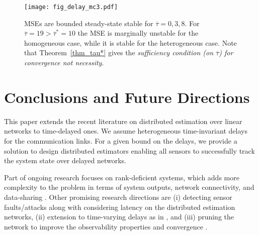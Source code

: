 \documentclass[journal]{IEEEtran}
\begin{document}
\begin{figure} %
	\centering
	\texttt{[image: fig\_delay\_mc3.pdf]}
	\caption{MSEs are bounded steady-state stable for $\overline{\tau}=0,3,8$. For $\overline{\tau}=19> \overline{\tau}^*=10$ the MSE is marginally unstable for the homogeneous case, while it is stable for the heterogeneous case. Note that  Theorem~\ref{thm_tau*} gives the \textit{sufficiency condition (on $\overline{\tau}$) for convergence not necessity}.
	} \label{fig_delay_mc}
\end{figure}

\section{Conclusions and Future Directions} \label{sec_conc}

This paper extends the recent literature on distributed estimation over  linear networks to time-delayed ones. We assume heterogeneous time-invariant  delays for the communication links. For a given bound on the delays, we provide a solution to design distributed estimators enabling all sensors to successfully track the system state over delayed networks. 

Part of ongoing research focuses on rank-deficient systems, which adds more complexity to the problem in terms of system outputs, network connectivity, and data-sharing  \cite{icassp13,pequito2015framework}. 
Other promising research directions are (i) detecting sensor faults/attacks \cite{deghat2019detection,tcns_fdi} along with considering latency on the distributed estimation networks, (ii) extension to time-varying delays as in \cite{Themis_delay}, and (iii)
pruning the network to improve the observability properties and convergence \cite{lcss2020,pirani_eigvalue}.
\end{document}

